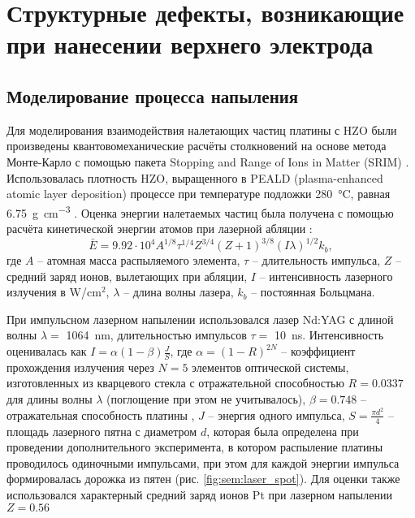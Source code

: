 \chapter{Структурные дефекты, возникающие при нанесении верхнего электрода}\label{ch:ch3}
\section{Моделирование процесса напыления}\label{sec:ch3/sec2}
Для моделирования взаимодействия налетающих частиц платины с HZO были произведены квантовомеханические расчёты столкновений на основе метода Монте-Карло с помощью пакета Stopping and Range of Ions in Matter (SRIM) \cite{zieglerSRIMStoppingRange2010}. Использовалась плотность HZO, выращенного в PEALD (plasma-enhanced atomic layer deposition) процессе при температуре подложки \SI{280}{\degreeCelsius}, равная \SI{6.75}{\gram\per\cm\cubed} \cite{kimEffectProcessTemperature2022}. Оценка энергии налетаемых частиц была получена с помощью расчёта кинетической энергии атомов при лазерной абляции \cite{mutaevVLIYaNIEVERHNEYGRANICY2020}:
\[\bar{E} = 9.92 \cdot 10^{4} A^{1/8} \tau^{1/4} Z^{3/4} (Z+1)^{3/8} (I\lambda)^{1/2}k_b,\] где \(A\) -- атомная масса распыляемого элемента, \(\tau\) -- длительность импульса, \(Z\) -- средний заряд ионов, вылетающих при абляции, \(I\) -- интенсивность лазерного излучения в \si{\watt}/\si{\cm}\(^2\), \(\lambda\) -- длина волны лазера, \(k_b\) -- постоянная Больцмана.

При импульсном лазерном напылении использовался лазер Nd:YAG с длиной волны \(\lambda=\) \SI{1064}{\nano\meter}, длительностью импульсов \(\tau=\) \SI{10}{\nano\second}. Интенсивность оценивалась как \(I=\alpha(1-\beta)\frac{J}{S}\), где \(\alpha=(1-R)^{2N}\) -- коэффициент прохождения излучения через \(N=5\) элементов оптической системы, изготовленных из кварцевого стекла с отражательной способностью \(R=0.0337\) \cite{polyanskiyRefractiveindexInfoDatabase2024} для длины волны \(\lambda\) (поглощение при этом не учитывалось), \(\beta=0.748\) -- отражательная способность платины \cite{weberHandbookOpticalMaterials2003}, \(J\) -- энергия одного импульса, \(S=\frac{\pi d^2}{4}\) -- площадь лазерного пятна с диаметром \(d\), которая была определена при проведении дополнительного эксперимента, в котором распыление платины проводилось одиночными импульсами, при этом для каждой энергии импульса формировалась дорожка из пятен (рис. \cref{fig:sem:laser_spot}). Для оценки также использовался характерный средний заряд ионов Pt при лазерном напылении $Z=0.56$ \cite[с.~141]{easonPulsedLaserDeposition2007}

